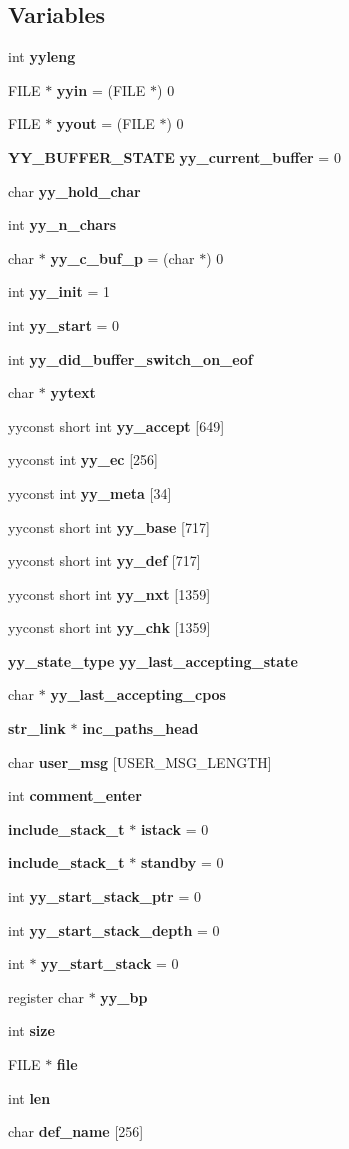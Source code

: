 \subsection*{Variables}
\begin{CompactItemize}
\item 
int {\bf yyleng}
\item 
FILE $\ast$ {\bf yyin} = (FILE $\ast$) 0
\item 
FILE $\ast$ {\bf yyout} = (FILE $\ast$) 0
\item 
{\bf YY\_\-BUFFER\_\-STATE} {\bf yy\_\-current\_\-buffer} = 0
\item 
char {\bf yy\_\-hold\_\-char}
\item 
int {\bf yy\_\-n\_\-chars}
\item 
char $\ast$ {\bf yy\_\-c\_\-buf\_\-p} = (char $\ast$) 0
\item 
int {\bf yy\_\-init} = 1
\item 
int {\bf yy\_\-start} = 0
\item 
int {\bf yy\_\-did\_\-buffer\_\-switch\_\-on\_\-eof}
\item 
char $\ast$ {\bf yytext}
\item 
yyconst short int {\bf yy\_\-accept} [649]
\item 
yyconst int {\bf yy\_\-ec} [256]
\item 
yyconst int {\bf yy\_\-meta} [34]
\item 
yyconst short int {\bf yy\_\-base} [717]
\item 
yyconst short int {\bf yy\_\-def} [717]
\item 
yyconst short int {\bf yy\_\-nxt} [1359]
\item 
yyconst short int {\bf yy\_\-chk} [1359]
\item 
{\bf yy\_\-state\_\-type} {\bf yy\_\-last\_\-accepting\_\-state}
\item 
char $\ast$ {\bf yy\_\-last\_\-accepting\_\-cpos}
\item 
{\bf str\_\-link} $\ast$ {\bf inc\_\-paths\_\-head}
\item 
char {\bf user\_\-msg} [USER\_\-MSG\_\-LENGTH]
\item 
int {\bf comment\_\-enter}
\item 
{\bf include\_\-stack\_\-t} $\ast$ {\bf istack} = 0
\item 
{\bf include\_\-stack\_\-t} $\ast$ {\bf standby} = 0
\item 
int {\bf yy\_\-start\_\-stack\_\-ptr} = 0
\item 
int {\bf yy\_\-start\_\-stack\_\-depth} = 0
\item 
int $\ast$ {\bf yy\_\-start\_\-stack} = 0
\item 
register char $\ast$ {\bf yy\_\-bp}
\item 
int {\bf size}
\item 
FILE $\ast$ {\bf file}
\item 
int {\bf len}
\item 
char {\bf def\_\-name} [256]
\end{CompactItemize}


